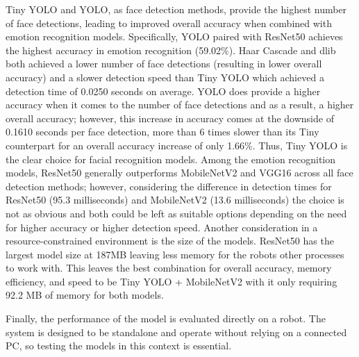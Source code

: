 Tiny YOLO and YOLO, as face detection methods, provide the highest number of face detections, leading to improved overall accuracy when combined with emotion recognition models. Specifically, YOLO paired with ResNet50 achieves the highest accuracy in emotion recognition (59.02\%). Haar Cascade and dlib both achieved a lower number of face detections (resulting in lower overall accuracy) and a slower detection speed than Tiny YOLO which achieved a detection time of 0.0250 seconds on average. YOLO does provide a higher accuracy when it comes to the number of face detections and as a result, a higher overall accuracy; however, this increase in accuracy comes at the downside of 0.1610 seconds per face detection, more than 6 times slower than its Tiny counterpart for an overall accuracy increase of only 1.66\%. Thus, Tiny YOLO is the clear choice for facial recognition models. Among the emotion recognition models, ResNet50 generally outperforms MobileNetV2 and VGG16 across all face detection methods; however, considering the difference in detection times for ResNet50 (95.3 milliseconds) and MobileNetV2 (13.6 milliseconds) the choice is not as obvious and both could be left as suitable options depending on the need for higher accuracy or higher detection speed. Another consideration in a resource-constrained environment is the size of the models. ResNet50 has the largest model size at 187MB leaving less memory for the robots other processes to work with. This leaves the best combination for overall accuracy, memory efficiency, and speed to be Tiny YOLO + MobileNetV2 with it only requiring 92.2 MB of memory for both models.

Finally, the performance of the model is evaluated directly on a robot. The system is designed to be standalone and operate without relying on a connected PC, so testing the models in this context is essential.

